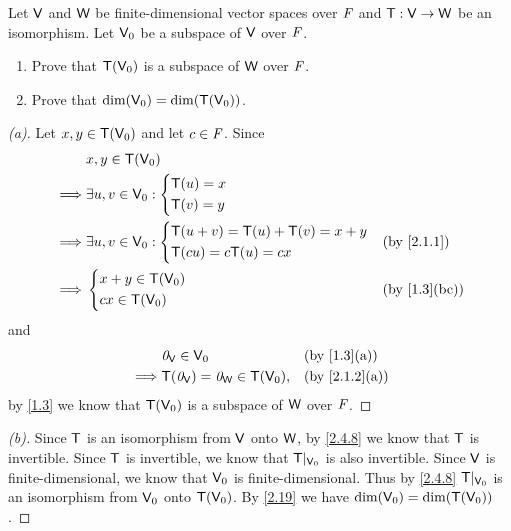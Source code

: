 \begin{ex}\label{ex:2.4.17}
	Let \(\mathsf{V}\) and \(\mathsf{W}\) be finite-dimensional vector spaces over \(\mathit{F}\) and \(\mathsf{T} : \mathsf{V} \to \mathsf{W}\) be an isomorphism.
	Let \(\mathsf{V}_0\) be a subspace of \(\mathsf{V}\) over \(\mathit{F}\).
	\begin{enumerate}
		\item Prove that \(\mathsf{T}(\mathsf{V}_0)\) is a subspace of \(\mathsf{W}\) over \(\mathit{F}\).
		\item Prove that \(\dim(\mathsf{V}_0) = \dim(\mathsf{T}(\mathsf{V}_0))\).
	\end{enumerate}
\end{ex}

\begin{proof}[(a)]
	Let \(x, y \in \mathsf{T}(\mathsf{V}_0)\) and let \(c \in \mathit{F}\).
	Since
	\begin{align*}
		         & x, y \in \T(\V_0)                                         \\
		\implies & \exists u, v \in \V_0 : \begin{dcases}
			                                   \T(u) = x \\
			                                   \T(v) = y
		                                   \end{dcases}                     \\
		\implies & \exists u, v \in \V_0 : \begin{dcases}
			                                   \T(u + v) = \T(u) + \T(v) = x + y \\
			                                   \T(cu) = c \T(u) = cx
		                                   \end{dcases} &  & \by{2.1.1} \\
		\implies & \begin{dcases}
			           x + y \in \T(\V_0) \\
			           cx \in \T(\V_0)
		           \end{dcases}                  &  & \by{1.3}[bc]
	\end{align*}
	and
	\begin{align*}
		         & \zv_{\V} \in \V_0                     &  & \by{1.3}[a]   \\
		\implies & \T(\zv_{\V}) = \zv_{\W} \in \T(\V_0), &  & \by{2.1.2}[a]
	\end{align*}
	by \cref{1.3} we know that \(\mathsf{T}(\mathsf{V}_0)\) is a subspace of \(\mathsf{W}\) over \(\mathit{F}\).
\end{proof}

\begin{proof}[(b)]
	Since \(\mathsf{T}\) is an isomorphism from \(\mathsf{V}\) onto \(\mathsf{W}\), by \cref{2.4.8} we know that \(\mathsf{T}\) is invertible.
	Since \(\mathsf{T}\) is invertible, we know that \(\mathsf{T}|_{\mathsf{V}_0}\) is also invertible.
	Since \(\mathsf{V}\) is finite-dimensional, we know that \(\mathsf{V}_0\) is finite-dimensional.
	Thus by \cref{2.4.8} \(\mathsf{T}|_{\mathsf{V}_0}\) is an isomorphism from \(\mathsf{V}_0\) onto \(\mathsf{T}(\mathsf{V}_0)\).
	By \cref{2.19} we have \(\dim(\mathsf{V}_0) = \dim(\mathsf{T}(\mathsf{V}_0))\).
\end{proof}


